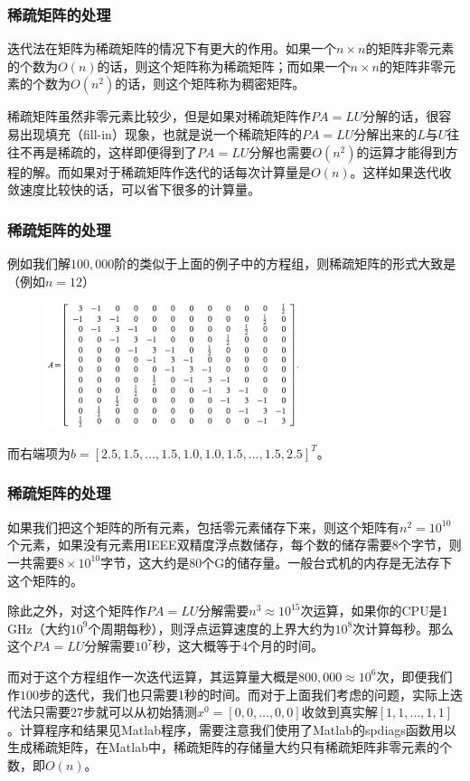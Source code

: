 \documentclass[10pt]{beamer}
\begin{document}
\begin{frame}
\frametitle{稀疏矩阵的处理}
迭代法在矩阵为稀疏矩阵的情况下有更大的作用。如果一个$n \times n$的矩阵非零元素的个数为$O(n)$的话，则这个矩阵称为稀疏矩阵；而如果一个$n \times n$的矩阵非零元素的个数为$O(n^2)$的话，则这个矩阵称为稠密矩阵。

\vspace{0.2cm}

稀疏矩阵虽然非零元素比较少，但是如果对稀疏矩阵作$PA = LU$分解的话，很容易出现填充（fill-in）现象，也就是说一个稀疏矩阵的$PA = LU$分解出来的$L$与$U$往往不再是稀疏的，这样即便得到了$PA = LU$分解也需要$O(n^2)$的运算才能得到方程的解。而如果对于稀疏矩阵作迭代的话每次计算量是$O(n)$。这样如果迭代收敛速度比较快的话，可以省下很多的计算量。
\end{frame}


\begin{frame}
\frametitle{稀疏矩阵的处理}
例如我们解$100,000$阶的类似于上面的例子中的方程组，则稀疏矩阵的形式大致是（例如$n = 12$）
\begin{figure}
\includegraphics[width=7.5cm]{figs/2_5_SOR-5} 
\end{figure}
而右端项为$b = [2.5, 1.5, \ldots, 1.5, 1.0, 1.0, 1.5, \ldots, 1.5, 2.5]^T$。
\end{frame}


\begin{frame}
\frametitle{稀疏矩阵的处理}
如果我们把这个矩阵的所有元素，包括零元素储存下来，则这个矩阵有$n^2 = 10^{10}$个元素，如果没有元素用IEEE双精度浮点数储存，每个数的储存需要$8$个字节，则一共需要$8 \times 10^{10}$字节，这大约是80个G的储存量。一般台式机的内存是无法存下这个矩阵的。

\vspace{0.2cm}

除此之外，对这个矩阵作$PA = LU$分解需要$n^3 \approx 10^{15}$次运算，如果你的CPU是1 GHz（大约$10^9$个周期每秒），则浮点运算速度的上界大约为$10^8$次计算每秒。那么这个$PA = LU$分解需要$10^7$秒，这大概等于4个月的时间。

\vspace{0.2cm}

而对于这个方程组作一次迭代运算，其运算量大概是$800,000 \approx 10^6$次，即便我们作$100$步的迭代，我们也只需要1秒的时间。而对于上面我们考虑的问题，实际上迭代法只需要$27$步就可以从初始猜测$x^0 = [0,0, \ldots, 0, 0]$收敛到真实解$[1,1,\ldots,1,1]$。计算程序和结果见Matlab程序，需要注意我们使用了Matlab的spdiags函数用以生成稀疏矩阵，在Matlab中，稀疏矩阵的存储量大约只有稀疏矩阵非零元素的个数，即$O(n)$。


\end{frame}
\end{document}
